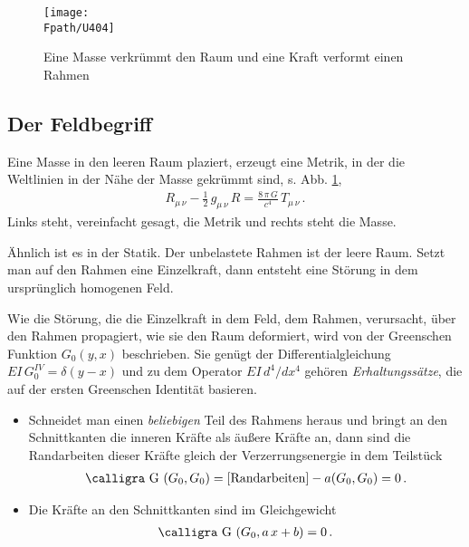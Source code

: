 {{{{{%
\begin{figure}[tbp]
\centering
\if {} \sidecaption \fi
\texttt{[image: \\Fpath/U404]}
\caption{Eine Masse verkr\"{u}mmt den Raum und eine Kraft verformt einen Rahmen}
\label{U404}%
\end{figure}%
\textcolor{blau2}{\section{Der Feldbegriff}}
Eine Masse in den leeren Raum plaziert, erzeugt eine Metrik, in der die Weltlinien in der N\"{a}he der Masse gekr\"{u}mmt sind, s. Abb. \ref{U404},
\begin{align}
R_{\mu\,\nu} - \frac{1}{2}\,g_{\mu\,\nu}\,R = \frac{8\,\pi\,G}{c^4}\,T_{\mu\,\nu}\,.
\end{align}
Links steht, vereinfacht gesagt, die Metrik und rechts steht die Masse.

\"{A}hnlich ist es in der Statik. Der  unbelastete Rahmen ist der leere Raum. Setzt man auf den Rahmen eine Einzelkraft, dann entsteht eine St\"{o}rung in dem urspr\"{u}nglich homogenen Feld.

Wie die St\"{o}rung, die die Einzelkraft in dem Feld, dem Rahmen, verursacht, \"{u}ber den Rahmen propagiert, wie sie den Raum deformiert, wird von der Greenschen Funktion $G_0(y,x)$ beschrieben. Sie gen\"{u}gt der Differentialgleichung $EI\,G_0^{IV} = \delta(y-x)$ und zu dem Operator $EI\,d^4/dx^4$ geh\"{o}ren {\em Erhaltungss\"{a}tze\/}, die auf der ersten Greenschen Identit\"{a}t basieren.\\

\begin{itemize}
  \item Schneidet man einen {\em beliebigen\/} Teil des Rahmens heraus und bringt an den Schnittkanten die inneren Kr\"{a}fte als \"{a}u{\ss}ere Kr\"{a}fte an, dann sind die Randarbeiten dieser Kr\"{a}fte gleich der Verzerrungsenergie in dem Teilst\"{u}ck
      \begin{align}
      \text{\normalfont\calligra G\,\,}(G_0, G_0) = [\text{Randarbeiten]} - a(G_0,G_0) = 0\,.
      \end{align}
  \item Die Kr\"{a}fte an den Schnittkanten sind im Gleichgewicht
   \begin{align}
      \text{\normalfont\calligra G\,\,}(G_0, a\,x + b) = 0\,.
      \end{align}
\end{itemize}

}}}}}
